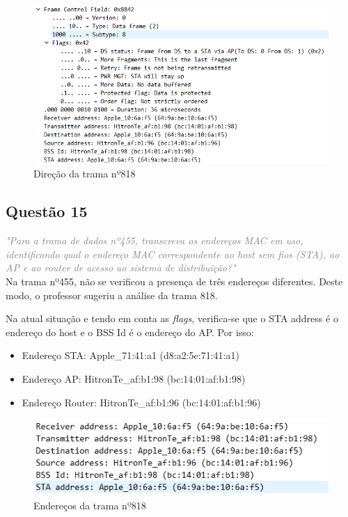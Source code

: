 \documentclass{llncs}
\newcommand{\questionE}[1]{\textcolor{gray}{\textit{"#1"}}}
\begin{document}
\begin{figure}[H]
\begin{center}
\includegraphics[width=12cm]{14.PNG}
\end{center}
\caption{Direção da trama nº818}
\end{figure}

\subsection*{Questão 15}
\hspace{3mm} 
\questionE{Para a trama de dados nº455, transcreva os endereços MAC em uso, identificando qual o endereço MAC correspondente ao host sem fios (STA), ao AP e ao router de acesso ao sistema de distribuição?}\\ 

Na trama nº455, não se verificou a presença de três endereços diferentes. Deste modo, o professor sugeriu a análise da trama 818.

Na atual situação e tendo em conta as \textit{flags}, verifica-se que o STA address é o endereço do host e o BSS Id é o endereço do AP. Por isso:

\begin{itemize}
    \item Endereço STA: Apple\_71:41:a1 (d8:a2:5e:71:41:a1)
    \item Endereço AP: HitronTe\_af:b1:98 (bc:14:01:af:b1:98)
    \item Endereço Router: HitronTe\_af:b1:96 (bc:14:01:af:b1:96)
\end{itemize}

\begin{figure}[H]
\begin{center}
\includegraphics[width=12cm]{15.PNG}
\end{center}
\caption{Endereços da trama nº818}
\end{figure}
\end{document}
